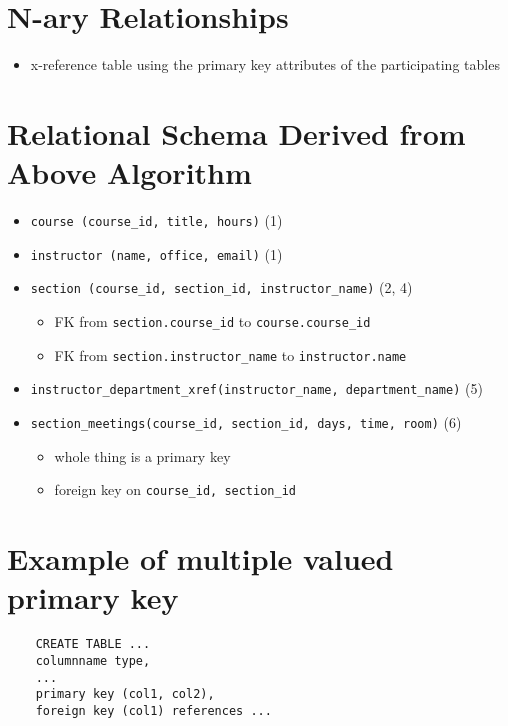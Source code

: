 \documentclass{../cheatsheet}
\begin{document}
\begin{multicols*}{2}
    \section{N-ary Relationships}
    \begin{itemize}
        \item x-reference table using the primary key attributes of the
            participating tables
    \end{itemize}

    \section{Relational Schema Derived from Above Algorithm}
    \begin{itemize}
        \item \texttt{course (course\_id, title, hours)} (1)
        \item \texttt{instructor (name, office, email)} (1)
        \item \texttt{section (course\_id, section\_id, instructor\_name)} (2, 4)
            \begin{itemize}
                \item FK from \texttt{section.course\_id} to \texttt{course.course\_id}
                \item FK from \texttt{section.instructor\_name} to \texttt{instructor.name}
            \end{itemize}
        \item \texttt{instructor\_department\_xref(instructor\_name,
            department\_name)} (5)
        \item \texttt{section\_meetings(course\_id, section\_id, days, time, room)} (6)
            \begin{itemize}
                \item whole thing is a primary key
                \item foreign key on \texttt{course\_id, section\_id}
            \end{itemize}
    \end{itemize}

    \section{Example of multiple valued primary key}
    \begin{verbatim}
    CREATE TABLE ...
    columnname type,
    ...
    primary key (col1, col2),
    foreign key (col1) references ...
    \end{verbatim}


\end{multicols*}
\end{document}
